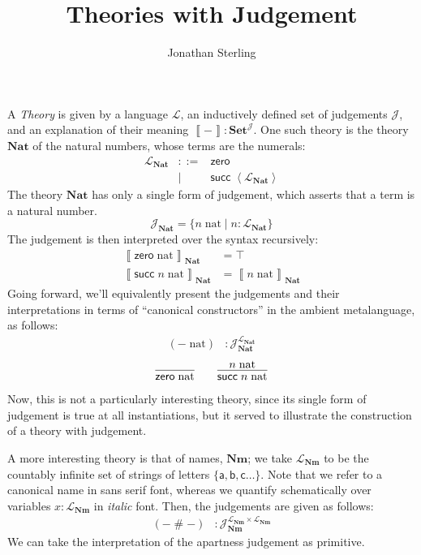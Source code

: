 \documentclass{amsart}
\theoremstyle{definition}
\theoremstyle{remark}
\numberwithin{equation}{section}
\newcommand{\SET}{\textbf{Set}}
\newcommand{\sem}[1]{\left\llbracket#1\right\rrbracket}
\newcommand{\quo}[1]{\left\langle#1\right\rangle}
\begin{document}
\title{Theories with Judgement}
\author{Jonathan Sterling}
\address{AlephCloud Systems}

\maketitle

A \emph{Theory} is given by a language $\mathcal{L}$, an inductively defined set of judgements
$\mathcal{J}$, and an explanation of their meaning $\sem{-} :
\SET^\mathcal{J}$.  One such theory is the theory $\mathbf{Nat}$ of the natural
numbers, whose terms are the numerals:
\[
  \begin{array}{lcl}
    \mathcal{L}_\mathbf{Nat}
      &::= &\mathsf{zero}\\
      &\mid &\mathsf{succ}\;\quo{\mathcal{L}_\mathbf{Nat}}
  \end{array}
\]
The theory $\mathbf{Nat}$ has only a single form of judgement, which asserts that a term is a natural number.
\[
  \mathcal{J}_\mathbf{Nat} = \{n\;\mathrm{nat} \mid n : \mathcal{L}_\mathbf{Nat} \}
\]
The judgement is then interpreted over the syntax recursively:
\begin{align*}
  \sem{\mathsf{zero}\;\mathrm{nat}}_\mathbf{Nat} &= \top\\
  \sem{\mathsf{succ}\;n\;\mathrm{nat}}_\mathbf{Nat} &= \sem{n\;\mathrm{nat}}_\mathbf{Nat}
\end{align*}
Going forward, we'll equivalently present the judgements and their
interpretations in terms of ``canonical constructors'' in the ambient
metalanguage, as follows:
\begin{align*}
  (-\;\mathrm{nat}) &: \mathcal{J}_\mathbf{Nat}^{\mathcal{L}_\mathbf{Nat}}
\end{align*}
\begin{gather*}
  \infer{\mathsf{zero}\;\mathrm{nat}}{}
  \qquad
  \infer{\mathsf{succ}\;n\;\mathrm{nat}}{n\;\mathrm{nat}}
\end{gather*}
Now, this is not a particularly interesting theory, since its single form of
judgement is true at all instantiations, but it served to illustrate the
construction of a theory with judgement.

A more interesting theory is that of names, $\mathbf{Nm}$; we take
$\mathcal{L}_\mathbf{Nm}$ to be the countably infinite set of strings of
letters $\{\mathsf{a},\mathsf{b},\mathsf{c}\dots\}$. Note that we refer to a
canonical name in \textsf{sans serif} font, whereas we quantify schematically
over variables $x:\mathcal{L}_\mathbf{Nm}$ in \textit{italic} font. Then, the
judgements are given as follows:
\begin{align*}
  (-\mathop{\#}-) &: \mathcal{J}_\mathbf{Nm}^{\mathcal{L}_\mathbf{Nm}\times\mathcal{L}_\mathbf{Nm}}
  \tag{Apartness}
\end{align*}
We can take the interpretation of the apartness judgement as primitive.
\end{document}
